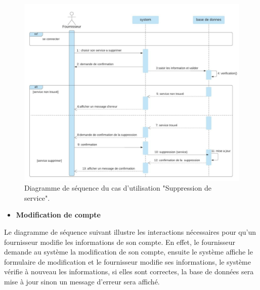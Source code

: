 \documentclass[french]{report}
\begin{document}
    \begin{figure}[H]
            \centering
            \includegraphics[width=1\textwidth]{images/sequence diag supp service.jpg}
            \caption{Diagramme de séquence du cas d'utilisation "Suppression de service".}
            \label{fig:my_label}
    \end{figure}
        
        \begin{itemize}
            \item \textbf{Modification de compte}
        \end{itemize}
        Le diagramme de séquence suivant illustre les interactions nécessaires pour qu'un fournisseur modifie les 
	informations de son compte. En effet, le fournisseur  demande au système la modification de son compte,
	ensuite le système affiche le formulaire de modification et le fournisseur  modifie ses informations,
	le système vérifie à nouveau les informations, si elles sont correctes, la base de données sera 
	mise à jour sinon un message d'erreur sera affiché.
    
\end{document}
